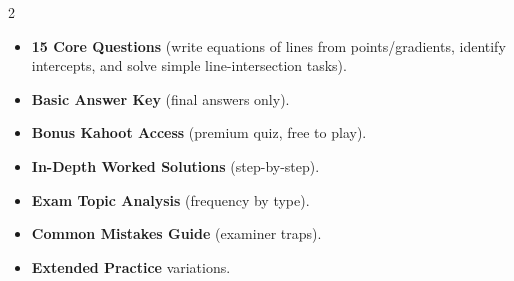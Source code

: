 \documentclass[11pt,a4paper]{article}
\newcommand{\FullReleaseDate}{April 30, 2026}
\begin{document}
\vspace{8pt}

\begin{multicols}{2}
  \begin{tcolorbox}[card, title=\sffamily\bfseries\textcolor{white}{\faHandPointDown\ TODAY (Simplified Version)}, colbacktitle=mainblue, boxed title style={sharp corners, boxrule=0pt}]
    \begin{itemize}[leftmargin=1.2em, itemsep=2pt]
      \item \small \textbf{15 Core Questions} (write equations of lines from points/gradients, identify intercepts, and solve simple line-intersection tasks).
      \item \small \textbf{Basic Answer Key} (final answers only).
      \item \small \textbf{Bonus Kahoot Access} (premium quiz, free to play).
    \end{itemize}
  \end{tcolorbox}

  \columnbreak

  \begin{tcolorbox}[card, title=\sffamily\bfseries\textcolor{white}{\faRocket\ ON \FullReleaseDate\ (Full Upgrade)}, colbacktitle=mainblue, boxed title style={sharp corners, boxrule=0pt}]
    \begin{itemize}[leftmargin=1.2em, itemsep=2pt]
      \item \small \textbf{In-Depth Worked Solutions} (step-by-step).
      \item \small \textbf{Exam Topic Analysis} (frequency by type).
      \item \small \textbf{Common Mistakes Guide} (examiner traps).
      \item \small \textbf{Extended Practice} variations.
    \end{itemize}
  \end{tcolorbox}
\end{multicols}
\end{document}

